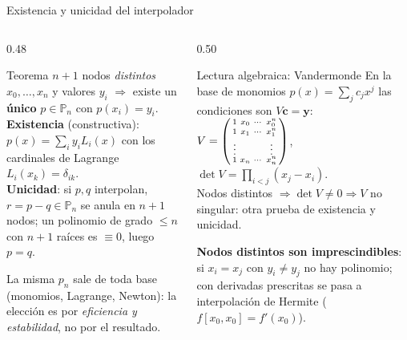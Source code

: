 \documentclass[aspectratio=169,10pt]{beamer}
\begin{document}
\begin{frame}{Existencia y unicidad del interpolador}
\begin{columns}[T]
\begin{column}{0.48\textwidth}
\begin{cardidea}{Teorema}{\faSuperscript}
{\footnotesize $n{+}1$ nodos \emph{distintos} $x_0,\dots,x_n$ y valores $y_i$ $\Rightarrow$ existe un \textbf{único} $p\in\mathbb P_n$ con $p(x_i)=y_i$.\\[1.2mm]
\textbf{Existencia} (constructiva): $p(x)=\sum_i y_iL_i(x)$ con los cardinales de Lagrange $L_i(x_k)=\delta_{ik}$.\\[1.0mm]
\textbf{Unicidad}: si $p,q$ interpolan, $r=p-q\in\mathbb P_n$ se anula en $n{+}1$ nodos; un polinomio de grado $\le n$ con $n{+}1$ raíces es $\equiv0$, luego $p=q$.}
\end{cardidea}
\vspace{1mm}
\begin{cardnota}[\faInfoCircle]
{\footnotesize La misma $p_n$ sale de toda base (monomios, Lagrange, Newton): la elección es por \emph{eficiencia y estabilidad}, no por el resultado.}
\end{cardnota}
\end{column}
\begin{column}{0.50\textwidth}
\begin{cardgear}{Lectura algebraica: Vandermonde}{\faCalculator}
{\footnotesize En la base de monomios $p(x)=\sum_j c_jx^j$ las condiciones son $V\mathbf c=\mathbf y$:\\[1.0mm]
$V=\begin{psmallmatrix}1&x_0&\cdots&x_0^n\\ 1&x_1&\cdots&x_1^n\\ \vdots&&&\vdots\\ 1&x_n&\cdots&x_n^n\end{psmallmatrix}$,\;
$\det V=\!\!\displaystyle\prod_{i<j}(x_j-x_i)$.\\[1.4mm]
Nodos distintos $\Rightarrow\det V\neq0\Rightarrow V$ no singular: otra prueba de existencia y unicidad.}
\end{cardgear}
\vspace{1mm}
\begin{cardnota}[\faExclamationTriangle]
{\footnotesize \textbf{Nodos distintos son imprescindibles}: si $x_i=x_j$ con $y_i\neq y_j$ no hay polinomio; con derivadas prescritas se pasa a interpolación de Hermite ($f[x_0,x_0]=f'(x_0)$).}
\end{cardnota}
\end{column}
\end{columns}
\end{frame}
\end{document}
